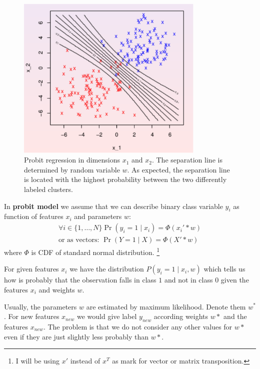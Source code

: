 \begin{figure}[!hb]
\centering
\includegraphics[width=0.8\textwidth]{probit2D}
\caption{Probit regression in dimensions $x_1$ and $x_2$. The separation line is determined by random variable $w$. As expected, the separation line 
 is located with the highest probability between the two differently labeled clusters.}
\label{fig:probit2D}
\end{figure}

\begin{defn}
    In {\bf probit model} we assume that we can describe binary class variable $y_i$ as function of features $x_i$ and parameters $w$:
\begin{align}
    \forall i\in\{1,\ldots,N\} \Pr(y_i=1 \mid x_i) = \Phi(x_i' * w) \\
    \text{or as vectors: } \Pr(Y=1 \mid X) = \Phi(X' * w)
\end{align}
where $\Phi$ is CDF of standard normal distribution.
\footnote{I will be using $x'$ instead of $x^T$ as mark for vector or matrix transposition.}
\end{defn}

For given features $x_i$ we have the distribution $P(y_i=1 \mid x_i, w)$ which tells us how is probably 
that the observation falls in class $1$ and not in class $0$ given the features $x_i$ and weights $w$.

Usually, the parameters $w$ are estimated by maximum likelihood. Denote them $w^*$. For new features $x_{new}$ we would give label $y_{new}$ according 
weights $w*$ and the features $x_{new}$. The problem is that we do not consider any other values for $w*$ even if they are just slightly less probably than $w*$. 

